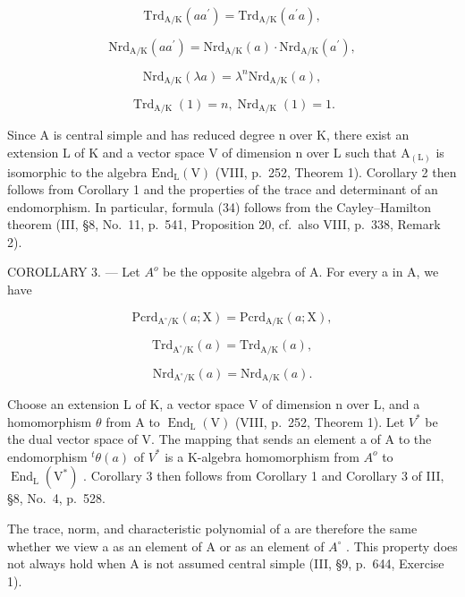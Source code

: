 \[
\mathrm{Trd} _ {\mathrm{A/K}} (a a ^ {\prime}) = \mathrm{Trd} _ {\mathrm{A/K}} (a ^ {\prime} a),\tag{37}
\]

\[
\mathrm{Nrd} _ {\mathrm{A/K}} (a a ^ {\prime}) = \mathrm{Nrd} _ {\mathrm{A/K}} (a) \cdot \mathrm{Nrd} _ {\mathrm{A/K}} (a ^ {\prime}),\tag{38}
\]

\[
\mathrm{Nrd} _ {\mathrm{A/K}} (\lambda a) = \lambda^ {n} \mathrm{Nrd} _ {\mathrm{A/K}} (a),
\]

\[
\operatorname{Trd} _ {\mathrm{A} / \mathrm{K}} (1) = n, \operatorname{Nrd} _ {\mathrm{A} / \mathrm{K}} (1) = 1.\tag{39}
\]

Since A is central simple and has reduced degree n over K, there exist an extension L of K and a vector space V of dimension n over L such that \(\mathrm{A}_{(\mathrm{L})}\) is isomorphic to the algebra \(\mathrm{End}_{\mathrm{L}}(\mathrm{V})\) (VIII, p.~252, Theorem 1). Corollary 2 then follows from Corollary 1 and the properties of the trace and determinant of an endomorphism. In particular, formula (34) follows from the Cayley--Hamilton theorem (III, §8, No.~11, p.~541, Proposition 20, cf.~also VIII, p.~338, Remark 2).

COROLLARY 3. --- Let \(A^{o}\) be the opposite algebra of A. For every a in A, we have

\[
\mathrm{Pcrd} _ {\mathrm {A^ {\circ} /K}} (a; \mathrm{X}) = \mathrm{Pcrd} _ {\mathrm{A/K}} (a; \mathrm{X}),\tag{40}
\]

\[
\mathrm{Trd} _ {\mathrm {A^{\circ} /K}} (a) = \mathrm{Trd} _ {\mathrm{A/K}} (a),\tag{41}
\]

\[
\mathrm{Nrd} _ {\mathrm {A^{\circ} /K}} (a) = \mathrm{Nrd} _ {\mathrm{A/K}} (a).\tag{42}
\]

Choose an extension L of K, a vector space V of dimension n over L, and a homomorphism \(\theta\) from A to \(\operatorname{End}_{\mathrm{L}}(\mathrm{V})\) (VIII, p.~252, Theorem 1). Let \(V^{*}\) be the dual vector space of V. The mapping that sends an element a of A to the endomorphism \({}^{t}\theta(a)\) of \(V^{*}\) is a K-algebra homomorphism from \(A^{o}\) to \(\operatorname{End}_{\mathrm{L}}(\mathrm{V}^{*})\) . Corollary 3 then follows from Corollary 1 and Corollary 3 of III, §8, No.~4, p.~528.

The trace, norm, and characteristic polynomial of a are therefore the same whether we view a as an element of A or as an element of \(A^{\circ}\) . This property does not always hold when A is not assumed central simple (III, §9, p.~644, Exercise 1).

